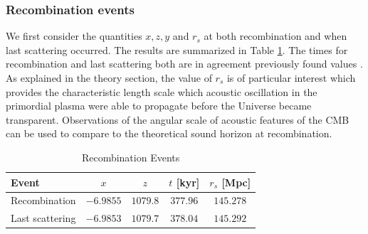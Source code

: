 \documentclass[%
reprint,
 amsmath,amssymb,
 aps,
]{revtex4-2}
\begin{document}
\subsubsection{Recombination events}
We first consider the quantities $x,z,y$ and $r_s$ at both recombination and when last scattering occurred. The results are summarized in Table \ref{tab:recombination_events}. The times for recombination and last scattering both are in agreement previously found values \cite{Planck:2018vyg}. As explained in the theory section, the value of $r_s$ is of particular interest which provides the characteristic length scale which acoustic oscillation in the primordial plasma were able to propagate before the Universe became transparent. Observations of the angular scale of acoustic features of the CMB can be used to compare to the theoretical sound horizon at recombination.
\renewcommand{\arraystretch}{1.25}
\begin{table}[ht!]
	\caption{Recombination Events}
	\label{tab:recombination_events}
	\begin{tabular}{|l|c|c|c|c|}
		\hline
		Event                               & $x$       & $z$      & $t$ [kyr] & $r_s$ [Mpc] \\\hline
		Recombination                & $-6.9855$ & $1079.8$ & $377.96$  & $145.278$   \\\hline
		Last scattering                 & $-6.9853$ & $1079.7$ & $378.04$  & $145.292$   \\\hline
	\end{tabular}
\end{table}
\end{document}
